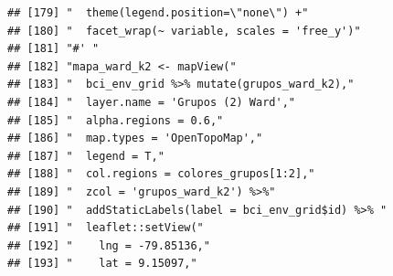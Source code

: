 \documentclass[11pt,]{article}
\begin{document}
\begin{verbatim}
## [179] "  theme(legend.position=\"none\") +"                                                                                                                                   
## [180] "  facet_wrap(~ variable, scales = 'free_y')"                                                                                                                           
## [181] "#' "                                                                                                                                                                   
## [182] "mapa_ward_k2 <- mapView("                                                                                                                                              
## [183] "  bci_env_grid %>% mutate(grupos_ward_k2),"                                                                                                                            
## [184] "  layer.name = 'Grupos (2) Ward',"                                                                                                                                     
## [185] "  alpha.regions = 0.6,"                                                                                                                                                
## [186] "  map.types = 'OpenTopoMap',"                                                                                                                                          
## [187] "  legend = T,"                                                                                                                                                         
## [188] "  col.regions = colores_grupos[1:2],"                                                                                                                                  
## [189] "  zcol = 'grupos_ward_k2') %>%"                                                                                                                                        
## [190] "  addStaticLabels(label = bci_env_grid$id) %>% "                                                                                                                       
## [191] "  leaflet::setView("                                                                                                                                                   
## [192] "    lng = -79.85136,"                                                                                                                                                  
## [193] "    lat = 9.15097,"                                                                                                                                                    

\end{verbatim}
\end{document}
